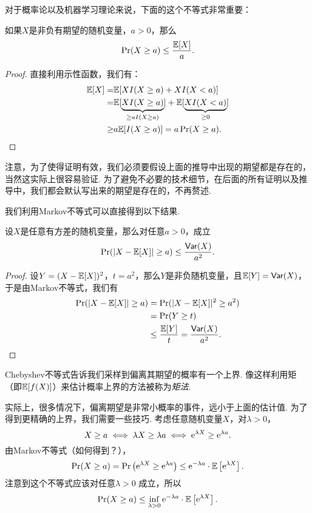 对于概率论以及机器学习理论来说，下面的这个不等式非常重要：

\begin{theorem}[Markov不等式]\label{thm:markov-inequality}
    如果$X$是非负有期望的随机变量，$a>0$，那么
        \[
            \Pr(X\geq a) \leq \frac{\mathbb{E}[X]}{a}.
        \]
\end{theorem}

\begin{proof}
直接利用示性函数，我们有：
    \begin{align*}
        \mathbb{E}[X] = &\mathbb{E}[X I(X\geq a)+X I(X<a)]\\
        =&\mathbb{E}[\underbrace{X I(X\geq a)}_{\geq aI(X\geq a)}]+\mathbb{E}[\underbrace{XI(X<a)}_{\geq 0}]\\
        \geq& a\mathbb{E}[I(X\geq a)]=a\Pr(X\geq a).
    \end{align*}
\end{proof}

注意，为了使得证明有效，我们必须要假设上面的推导中出现的期望都是存在的，当然这实际上很容易验证. 为了避免不必要的技术细节，在后面的所有证明以及推导中，我们都会默认写出来的期望是存在的，不再赘述. 

我们利用Markov不等式可以直接得到以下结果. 
\begin{corollary}[Chebyshev不等式]\label{cor:chebyshev-inequality}
设$X$是任意有方差的随机变量，那么对任意$a>0$，成立
    \[
        \Pr(|X - \mathbb{E}[X]| \geq a) \leq \frac{\mathsf{Var}(X)}{a^2}.
    \]
\end{corollary}
\begin{proof}
设$Y=(X-\mathbb{E}[X])^2$，$t=a^2$，那么$Y$是非负随机变量，且$\mathbb{E}[Y]=\mathsf{Var}(X)$，于是由Markov不等式，我们有
\begin{align*}
    \Pr(|X - \mathbb{E}[X]| \geq a) &= \Pr(|X - \mathbb{E}[X]|^2 \geq a^2) \\
    &=\Pr(Y \geq t) \\
    &\leq \frac{\mathbb{E}[Y]}{t}=\frac{\mathsf{Var}(X)}{a^2}.
\end{align*}
\end{proof}

Chebyshev不等式告诉我们采样到偏离其期望的概率有一个上界. 像这样利用矩（即$\mathbb{E}[f(X)]$）来估计概率上界的方法被称为\emph{矩法}. 

实际上，很多情况下，偏离期望是非常小概率的事件，远小于上面的估计值. 为了得到更精确的上界，我们需要一些技巧. 考虑任意随机变量$X$，对$\lambda >0$，
\[
X\geq a \iff \lambda X \geq \lambda a \iff \mathrm{e}^{\lambda X} \geq \mathrm{e}^{\lambda a}.
\]
由Markov不等式（如何得到？），
\[
\Pr(X\geq a) = \Pr\left(\mathrm{e}^{\lambda X} \geq \mathrm{e}^{\lambda a}\right) \leq \mathrm{e}^{- \lambda a}\cdot \mathbb{E}\left[\mathrm{e}^{\lambda X}\right]. 
\]
注意到这个不等式应该对任意$\lambda > 0$ 成立，所以
\[
\Pr(X\geq a) \leq \inf_{\lambda >0} \mathrm{e}^{- \lambda a}\cdot \mathbb{E} \left[\mathrm{e}^{\lambda X}\right].
\]

